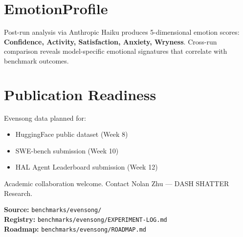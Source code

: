 \documentclass[11pt,a4paper]{article}
\begin{document}
\section{EmotionProfile}

Post-run analysis via Anthropic Haiku produces 5-dimensional emotion scores:
\textbf{Confidence, Activity, Satisfaction, Anxiety, Wryness}. Cross-run comparison reveals model-specific emotional signatures that correlate with benchmark outcomes.

\section{Publication Readiness}

Evensong data planned for:
\begin{itemize}
  \item HuggingFace public dataset (Week 8)
  \item SWE-bench submission (Week 10)
  \item HAL Agent Leaderboard submission (Week 12)
\end{itemize}

Academic collaboration welcome. Contact Nolan Zhu — DASH SHATTER Research.

\vfill
\textbf{Source:} \texttt{benchmarks/evensong/}\\
\textbf{Registry:} \texttt{benchmarks/evensong/EXPERIMENT-LOG.md}\\
\textbf{Roadmap:} \texttt{benchmarks/evensong/ROADMAP.md}
\end{document}
